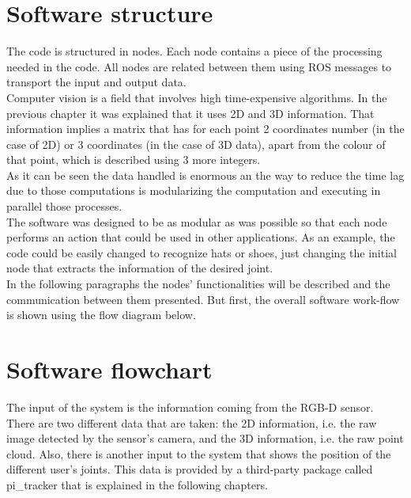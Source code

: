 
\section{Software structure}
\label{software_structure}


The code is structured in nodes. Each node contains a piece of the processing needed in the code. All nodes are related between them using ROS messages to transport the input and output data. 
\\

Computer vision is a field that involves high time-expensive algorithms. In the previous chapter it was explained that it uses 2D and 3D information. That information implies a matrix that has for each point 2 coordinates number (in the case of 2D) or 3 coordinates (in the case of 3D data), apart from the colour of that point, which is described using 3 more integers. \\

As it can be seen the data handled is enormous an the way to reduce the time lag due to those computations is modularizing the computation and executing in parallel those processes. 
\\

The software was designed to be as modular as was possible so that each node performs an action that could be used in other applications. 
As an example, the code could be easily changed to recognize hats or shoes, just changing the initial node that extracts the information of the desired joint. 
\\

In the following paragraphs the nodes' functionalities will be described and the communication between them presented. But first, the overall software work-flow is shown using the flow diagram below. 

\newpage

\section{Software flowchart}

The input of the system is the information coming from the RGB-D sensor. There are two different data that are taken: the 2D information, i.e. the raw image detected by the sensor's camera, and the 3D information, i.e. the raw point cloud. Also, there is another input to the system that shows the position of the different user's joints. This data is provided by a third-party package called pi\_tracker that is explained in the following chapters. 
\\

